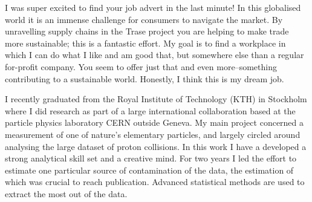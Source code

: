 \documentclass[11pt, a4paper]{../awesome-cv} %
\begin{document}
\sloppy %

\makecvheader %

\makelettertitle %


\begin{cvletter}
\vspace{.2cm}
I was super excited to find your job advert in the last minute!
In this globalised world it is an immense challenge for consumers to navigate the market.
By unravelling supply chains in the Trase project you are helping to make trade more sustainable; this is a fantastic effort.
My goal is to find a workplace in which I can do what I like and am good that, but somewhere else than a regular for-profit company.
You seem to offer just that and even more–something contributing to a sustainable world. 
Honestly, I think this is my dream job.

I recently graduated from the Royal Institute of Technology (KTH) in Stockholm where I did research as part of a large international collaboration based at the particle physics laboratory CERN outside Geneva.
My main project concerned a measurement of one of nature's elementary particles, and largely circled around analysing the large dataset of proton collisions. %
In this work I have a developed a strong analytical skill set and a creative mind. 
For two years I led the effort to estimate one particular source of contamination of the data, the estimation of which was crucial to reach publication. 
Advanced statistical methods are used to extract the most out of the data.


\end{cvletter}
\end{document}
